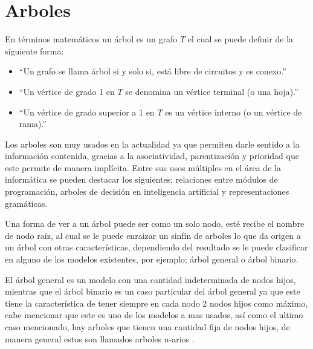 \section{Arboles}
En términos matemáticos un árbol es un grafo $T$ el cual se puede definir de
 la siguiente forma\cite{SUSANNAS.EPP2012}:

\begin{itemize}
	\item ``Un grafo se llama árbol si y solo si, está libre de circuitos y
	 es conexo.''
	\item ``Un vértice de grado 1 en $T$ se denomina un vértice terminal (o
	 una hoja).''
	\item ``Un vértice de grado superior a 1 en $T$ es un vértice interno (o
	 un vértice de rama).''
\end{itemize}

Los arboles son muy usados en la actualidad ya que permiten  darle sentido a
 la información contenida, gracias a la asociatividad, parentización y
 prioridad que este permite de manera implícita. Entre sus usos múltiples en
 el área de la informática se pueden destacar los  siguientes; relaciones
 entre módulos de programación, arboles de decisión en inteligencia artificial
 y representaciones gramáticas\cite{gutierrez1999estructuras}.  

Una forma de ver a un árbol puede ser como un solo nodo, esté recibe el nombre
 de  nodo raíz, al cual se le puede enraizar un sinfín de arboles lo que da
 origen  a un árbol con otras características, dependiendo del resultado se le
 puede clasificar en alguno de los modelos existentes, por ejemplo; árbol 
 general o árbol binario\cite{gutierrez1999estructuras}. 

El árbol general es un modelo con una cantidad indeterminada de nodos hijos,
 mientras que el árbol binario es un caso particular del árbol general ya que
 este tiene la característica de tener siempre en cada nodo 2 nodos hijos como
 máximo, cabe mencionar que este es uno de los modelos a mas usados, así como
 el ultimo caso mencionado, hay arboles que tienen una cantidad fija de nodos
 hijos, de manera general estos son llamados arboles n-arios
 \cite{gutierrez1999estructuras}.
 
